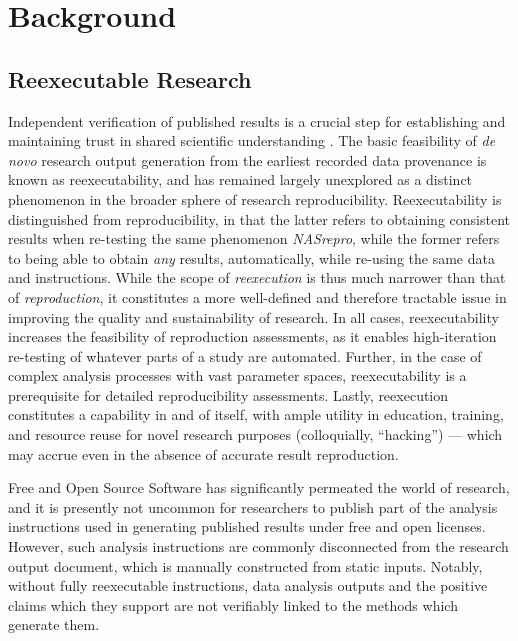 \section{Background}

\subsection{Reexecutable Research}

Independent verification of published results is a crucial step for establishing and maintaining trust in shared scientific understanding \cite{rpp, Ioannidis2005}.
The basic feasibility of \textit{de novo} research output generation from the earliest recorded data provenance is known as reexecutability, and  has remained largely unexplored as a distinct phenomenon in the broader sphere of research reproducibility.
Reexecutability is distinguished from reproducibility, in that the latter refers to obtaining consistent results when re-testing the same phenomenon \textit{NASrepro}, while the former refers to being able to obtain \textit{any} results, automatically, while re-using the same data and instructions.
While the scope of \textit{reexecution} is thus much narrower than that of \textit{reproduction}, it constitutes a more well-defined and therefore tractable issue in improving the quality and sustainability of research.
In all cases, reexecutability increases the feasibility of reproduction assessments, as it enables high-iteration re-testing of whatever parts of a study are automated.
Further, in the case of complex analysis processes with vast parameter spaces, reexecutability is a prerequisite for detailed reproducibility assessments.
Lastly, reexecution constitutes a capability in and of itself, with ample utility in education, training, and resource reuse for novel research purposes (colloquially, “hacking”) — which may accrue even in the absence of accurate result reproduction.

Free and Open Source Software \cite{foss} has significantly permeated the world of research, and it is presently not uncommon for researchers to publish part of the analysis instructions used in generating published results under free and open licenses.
However, such analysis instructions are commonly disconnected from the research output document, which is manually constructed from static inputs.
Notably, without fully reexecutable instructions, data analysis outputs and the positive claims which they support are not verifiably linked to the methods which generate them.

